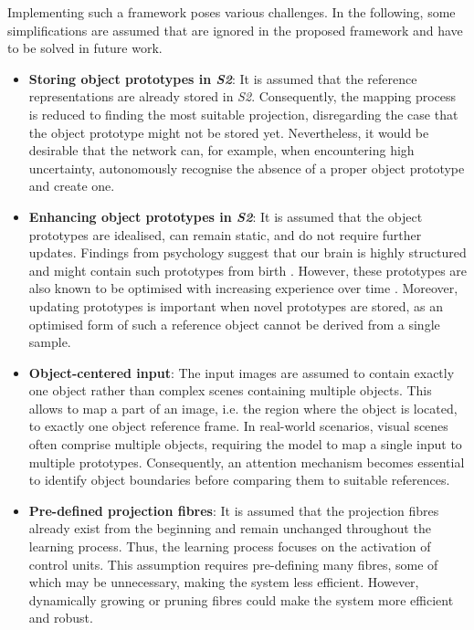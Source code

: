  Implementing such a framework poses various challenges.
In the following, some simplifications are assumed that are ignored in the proposed framework and have to be solved in future work.
\begin{itemize}
    \item \textbf{Storing object prototypes in \emph{S2}}: It is assumed that the reference representations are already stored in \emph{S2}. Consequently, the mapping process is reduced to finding the most suitable projection, disregarding the case that the object prototype might not be stored yet. Nevertheless, it would be desirable that the network can, for example, when encountering high uncertainty, autonomously recognise the absence of a proper object prototype and create one.
    \item \textbf{Enhancing object prototypes in \emph{S2}}: It is assumed that the object prototypes are idealised, can remain static, and do not require further updates. 
    Findings from psychology suggest that our brain is highly structured and might contain such prototypes from birth . However, these prototypes are also known to be optimised with increasing experience over time \cite{simion_face_2015}.
    Moreover, updating prototypes is important when novel prototypes are stored, as an optimised form of such a reference object cannot be derived from a single sample.
    \item \textbf{Object-centered input}: The input images are assumed to contain exactly one object rather than complex scenes containing multiple objects. This allows to map a part of an image, i.e. the region where the object is located, to exactly one object reference frame. In real-world scenarios, visual scenes often comprise multiple objects, requiring the model to map a single input to multiple prototypes. Consequently, an attention mechanism becomes essential to identify object boundaries before comparing them to suitable references.
    \item \textbf{Pre-defined projection fibres}: It is assumed that the projection fibres already exist from the beginning and remain unchanged throughout the learning process. Thus, the learning process focuses on the activation of control units. This assumption requires pre-defining many fibres, some of which may be unnecessary, making the system less efficient. However, dynamically growing or pruning fibres could make the system more efficient and robust.
\end{itemize}

